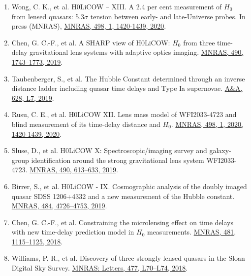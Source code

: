 \documentclass[margin, line]{res}
\begin{document}
\begin{resume}
\begin{enumerate}
	\item Wong, C. K., et al. H0LiCOW – XIII. A 2.4 per cent measurement of $H_0$ from lensed quasars: 5.3$\sigma$ tension between early- and late-Universe probes. In press (MNRAS), \href{https://doi.org/10.1093/mnras/stz3094}{MNRAS, 498, 1, 1420-1439, 2020}.
	\item Chen, G. C.-F., et al. A SHARP view of H0LiCOW: $H_0$ from three time-delay gravitational lens systems with adaptive optics imaging. \href{https://academic.oup.com/mnras/article/doi/10.1093/mnras/stz2547/5568378/}{MNRAS, 490, 1743--1773, 2019}.
	\item Taubenberger, S., et al. The Hubble Constant determined through an inverse distance ladder including quasar time delays and Type Ia supernovae. \href{https://www.aanda.org/articles/aa/abs/2019/08/aa35980-19/aa35980-19.html}{A\&A, 628, L7, 2019}.
	\item Rusu, C. E., et al. H0LiCOW XII. Lens mass model of WFI2033-4723 and blind measurement of its time-delay distance and $H_0$. \href{http://adsabs.harvard.edu/abs/2019arXiv190509338R}{MNRAS, 498, 1, 2020, 1420-1439, 2020}.
	\item Sluse, D., et al. H0LiCOW X: Spectroscopic/imaging survey and galaxy-group identification around the strong gravitational lens system WFI2033-4723. \href{https://academic.oup.com/mnras/article/doi/10.1093/mnras/stz2483/5561514/}{MNRAS, 490, 613--633, 2019}.
	\item Birrer, S., et al. H0LiCOW - IX. Cosmographic analysis of the doubly imaged quasar SDSS 1206+4332 and a new measurement of the Hubble constant. \href{https://doi.org/10.1093/mnras/stz200}{MNRAS, 484, 4726--4753, 2019}.
	\item Chen, G. C.-F., et al. Constraining the microlensing effect on time delays with new time-delay prediction model in $H_0$ measurements. \href{https://doi.org/10.1093/mnras/sty2350}{MNRAS, 481, 1115--1125, 2018}.
 	\item Williams, P. R., et al. Discovery of three strongly lensed quasars in the Sloan Digital Sky Survey. \href{https://doi.org/10.1093/mnrasl/sly043}{MNRAS: Letters, 477, L70--L74, 2018}.
\end{enumerate}


\end{resume}
\end{document}
